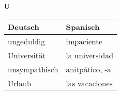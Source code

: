 \begin{flushright}\begin{Huge}\textbf{U}\end{Huge}\end{flushright}

\begin{longtable}{p{} p{}} 
\textbf{Deutsch}     & \textbf{Spanisch}                                       \\ \hline
\hline
\endhead %
ungeduldig & impaciente\\
Universität & la universidad\\
unsympathisch & anitpático, -a\\
Urlaub & las vacaciones\\

\end{longtable}
